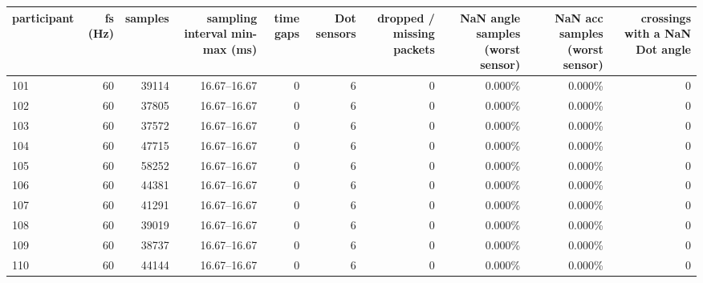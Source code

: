 \begin{adjustbox}{max width=\textwidth}
{\footnotesize
\begin{tabular}{lrrrrrrrrr}
\toprule
\textbf{participant} & \textbf{fs (Hz)} & \textbf{samples} & \textbf{sampling interval min-max (ms)} & \textbf{time gaps} & \textbf{Dot sensors} & \textbf{dropped / missing packets} & \textbf{NaN angle samples (worst sensor)} & \textbf{NaN acc samples (worst sensor)} & \textbf{crossings with a NaN Dot angle} \\
\midrule
101 & 60 & 39114 & 16.67--16.67 & 0 & 6 & 0 & 0.000\% & 0.000\% & 0 \\
102 & 60 & 37805 & 16.67--16.67 & 0 & 6 & 0 & 0.000\% & 0.000\% & 0 \\
103 & 60 & 37572 & 16.67--16.67 & 0 & 6 & 0 & 0.000\% & 0.000\% & 0 \\
104 & 60 & 47715 & 16.67--16.67 & 0 & 6 & 0 & 0.000\% & 0.000\% & 0 \\
105 & 60 & 58252 & 16.67--16.67 & 0 & 6 & 0 & 0.000\% & 0.000\% & 0 \\
106 & 60 & 44381 & 16.67--16.67 & 0 & 6 & 0 & 0.000\% & 0.000\% & 0 \\
107 & 60 & 41291 & 16.67--16.67 & 0 & 6 & 0 & 0.000\% & 0.000\% & 0 \\
108 & 60 & 39019 & 16.67--16.67 & 0 & 6 & 0 & 0.000\% & 0.000\% & 0 \\
109 & 60 & 38737 & 16.67--16.67 & 0 & 6 & 0 & 0.000\% & 0.000\% & 0 \\
110 & 60 & 44144 & 16.67--16.67 & 0 & 6 & 0 & 0.000\% & 0.000\% & 0 \\
\bottomrule
\end{tabular}
}
\end{adjustbox}
